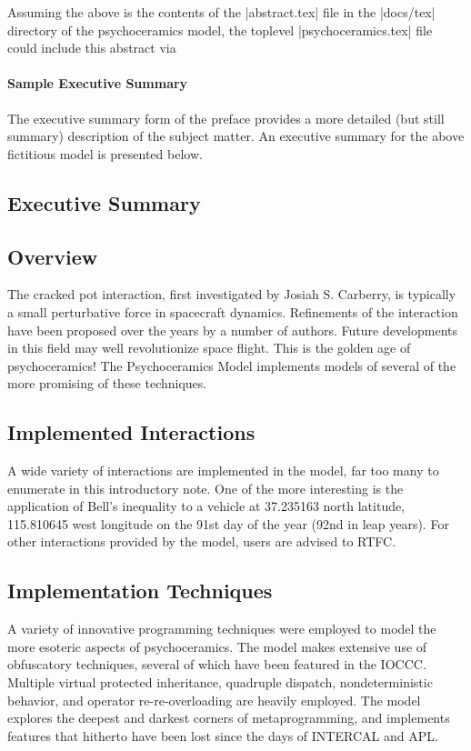 Assuming the above is the contents of the |abstract.tex| file in the |docs/tex|
directory of the psychoceramics model, the toplevel |psychoceramics.tex| file could include this abstract via
\begin{codeblock}
\end{codeblock}


\subsubsection{Sample Executive Summary}

The executive summary form of the preface provides a more detailed
(but still summary) description of the subject matter. An executive summary
for the above fictitious model is presented below.

\begin{codeblock}
\chapter*{Executive Summary}
\section*{Overview}
The cracked pot interaction, first investigated by Josiah S. Carberry, is
typically a small perturbative force in spacecraft dynamics. Refinements of
the interaction have been proposed over the years by a number of authors.
Future developments in this field may well revolutionize space flight.
This is the golden age of psychoceramics! The Psychoceramics Model
implements models of several of the more promising of these techniques.

\section*{Implemented Interactions}
A wide variety of interactions are implemented in the model, far too many to
enumerate in this introductory note. One of the more interesting is the
application of Bell's inequality to a vehicle at 37.235163 north latitude,
115.810645 west longitude on the 91st day of the year (92nd in leap years).
For other interactions provided by the model, users are advised to RTFC.

\section*{Implementation Techniques}
A variety of innovative programming techniques were employed to model the
more esoteric aspects of psychoceramics. The model makes extensive use of
obfuscatory techniques, several of which have been featured in the IOCCC.
Multiple virtual protected inheritance, quadruple dispatch, nondeterministic
behavior, and operator re-re-overloading are heavily employed. The model
explores the deepest and darkest corners of metaprogramming, and implements
features that hitherto have been lost since the days of INTERCAL and APL.
\end{codeblock}

